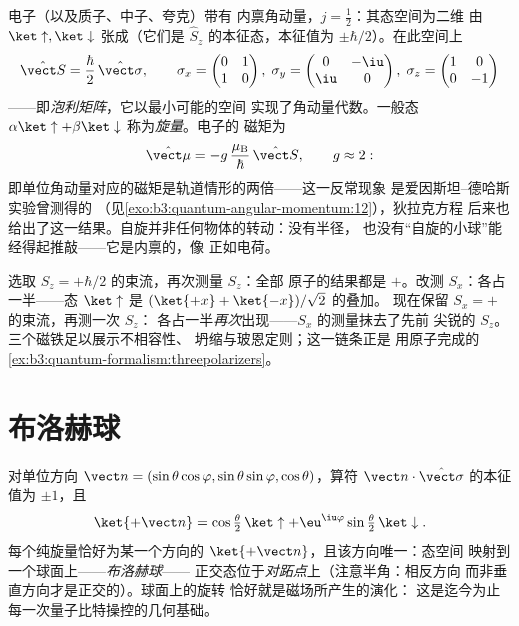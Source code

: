 \begin{definition}[自旋一半]\label{def:b3:spin-two-level:spin}
电子（以及质子、中子、夸克）带有
内禀角动量，$j = \tfrac12$：其态空间为二维
由 $\ket\uparrow, \ket\downarrow$ 张成（它们是
$\hat S_z$ 的本征态，本征值为 $\pm\hbar/2$）。在此空间上
\[
\hat{\vect S} = \frac\hbar2\,\hat{\vect\sigma} , \qquad
\sigma_x = \begin{pmatrix}0&1\\1&0\end{pmatrix} ,\;
\sigma_y = \begin{pmatrix}0&-\iu\\\iu&0\end{pmatrix} ,\;
\sigma_z = \begin{pmatrix}1&0\\0&-1\end{pmatrix}
\]
——即\emph{泡利矩阵}，它以最小可能的空间
实现了角动量代数。一般态
$\alpha\ket\uparrow + \beta\ket\downarrow$ 称为\emph{旋量}。电子的
磁矩为
\[
\hat{\vect\mu} = -g\,\frac{\mu_{\text{B}}}{\hbar}\,\hat{\vect S} ,
\qquad g \approx 2 :
\]
即单位角动量对应的磁矩是轨道情形的两倍——这一反常现象
是爱因斯坦–德哈斯实验曾测得的
（见\cref{exo:b3:quantum-angular-momentum:12}），狄拉克方程
后来也给出了这一结果。自旋并非任何物体的转动：没有半径，
也没有“自旋的小球”能经得起推敲——它是内禀的，像
正如电荷。
\end{definition}

\begin{example}\label{ex:b3:spin-two-level:chained}
选取 $S_z = +\hbar/2$ 的束流，再次测量 $S_z$：全部
原子的结果都是 $+$。改测 $S_x$：各占一半——态
$\ket\uparrow$ 是 $(\ket{+x} + \ket{-x})/\sqrt2$ 的叠加。
现在保留 $S_x = +$ 的束流，再测一次 $S_z$：
各占一半\emph{再次}出现——$S_x$ 的测量抹去了先前
尖锐的 $S_z$。三个磁铁足以展示不相容性、
坍缩与玻恩定则；这一链条正是
用原子完成的\cref{ex:b3:quantum-formalism:threepolarizers}。
\end{example}

\section{布洛赫球}

\begin{proposition}[沿任意轴的自旋]\label{prop:b3:spin-two-level:bloch}
对单位方向 $\vect n = (\sin\theta\cos\varphi,
\sin\theta\sin\varphi, \cos\theta)$，算符 $\vect
n\cdot\hat{\vect\sigma}$ 的本征值为 $\pm1$，且
\[
\ket{+\vect n} = \cos\tfrac\theta2\,\ket\uparrow +
\eu^{\iu\varphi}\sin\tfrac\theta2\,\ket\downarrow .
\]
每个纯旋量恰好为某一个方向的 $\ket{+\vect n}$，且该方向唯一：态空间
映射到一个球面上——\emph{布洛赫球}——
正交态位于\emph{对跖点}上（注意半角：相反方向
而非垂直方向才是正交的）。球面上的旋转
恰好就是磁场所产生的演化：
这是迄今为止每一次量子比特操控的几何基础。
\end{proposition}

